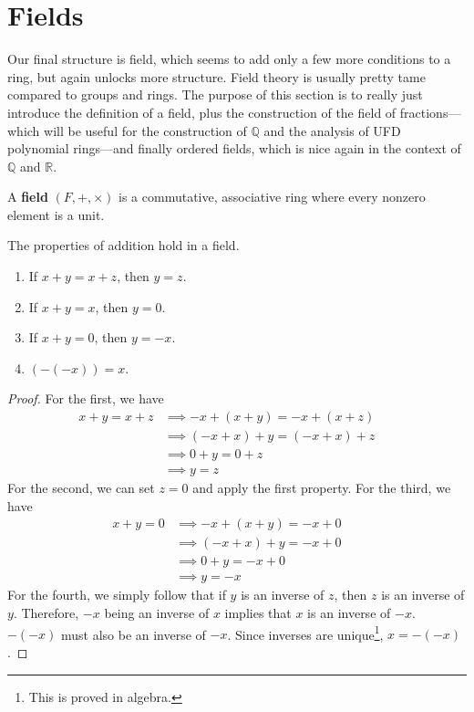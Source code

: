 \section{Fields}  

  Our final structure is field, which seems to add only a few more conditions to a ring, but again unlocks more structure. Field theory is usually pretty tame compared to groups and rings. The purpose of this section is to really just introduce the definition of a field, plus the construction of the field of fractions---which will be useful for the construction of $\mathbb{Q}$ and the analysis of UFD polynomial rings---and finally ordered fields, which is nice again in the context of $\mathbb{Q}$ and $\mathbb{R}$. 
  
  \begin{definition}[Field]
    A \textbf{field} $(F, +, \times)$ is a commutative, associative ring where every nonzero element is a unit. 
  \end{definition}

  \begin{lemma}
    The properties of addition hold in a field. 
    \begin{enumerate}
      \item If $x + y = x + z$, then $y = z$. 
      \item If $x + y = x$, then $y = 0$. 
      \item If $x + y = 0$, then $y = -x$. 
      \item $(-(-x)) = x$. 
    \end{enumerate}
  \end{lemma}
  \begin{proof}
    For the first, we have 
    \begin{align}
      x + y = x + z & \implies -x + (x + y) = -x + (x + z) && \tag{addition is a function} \\
                    & \implies (-x + x) + y = (-x + x) + z && \tag{$+$ is associative} \\
                    & \implies 0 + y = 0 + z && \tag{definition of additive inverse} \\
                    & \implies y = z && \tag{definition of identity}
    \end{align} 
    For the second, we can set $z = 0$ and apply the first property. For the third, we have 
    \begin{align}
      x + y = 0 & \implies -x + (x + y) = -x + 0 && \tag{addition is a function} \\
                & \implies (-x + x) + y = -x + 0 && \tag{$+$ is associative} \\
                & \implies 0 + y = -x + 0 && \tag{definition of additive inverse} \\
                & \implies y = -x && \tag{definition of identity}
    \end{align}
    For the fourth, we simply follow that if $y$ is an inverse of $z$, then $z$ is an inverse of $y$. Therefore, $-x$ being an inverse of $x$ implies that $x$ is an inverse of $-x$. $-(-x)$ must also be an inverse of $-x$. Since inverses are unique\footnote{This is proved in algebra.}, $x = -(-x)$. 
  \end{proof}

